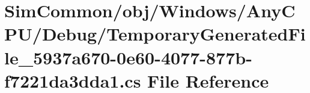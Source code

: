 \hypertarget{_sim_common_2obj_2_windows_2_any_c_p_u_2_debug_2_temporary_generated_file__5937a670-0e60-4077-877b-f7221da3dda1_8cs}{}\section{Sim\+Common/obj/\+Windows/\+Any\+C\+P\+U/\+Debug/\+Temporary\+Generated\+File\+\_\+5937a670-\/0e60-\/4077-\/877b-\/f7221da3dda1.cs File Reference}
\label{_sim_common_2obj_2_windows_2_any_c_p_u_2_debug_2_temporary_generated_file__5937a670-0e60-4077-877b-f7221da3dda1_8cs}
